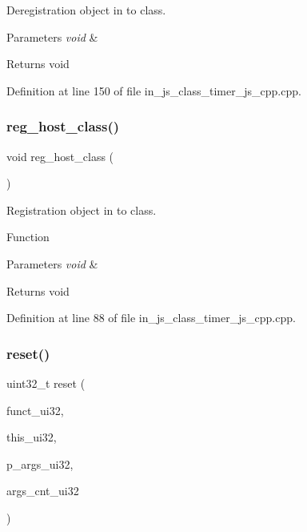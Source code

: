 Deregistration object in to class. 


\begin{DoxyParams}{Parameters}
{\em void} & \\
\hline
\end{DoxyParams}
\begin{DoxyReturn}{Returns}
void 
\end{DoxyReturn}


Definition at line 150 of file in\+\_\+js\+\_\+class\+\_\+timer\+\_\+js\+\_\+cpp.\+cpp.

\mbox{\label{group___timer_ga69ac449c8b71f2f20b05676a828a8382}} 
\subsubsection{reg\_host\_class()}
{\footnotesize\ttfamily void reg\+\_\+host\+\_\+class (\begin{DoxyParamCaption}\item[{void}]{ }\end{DoxyParamCaption})}



Registration object in to class. 

Function
\begin{DoxyParams}{Parameters}
{\em void} & \\
\hline
\end{DoxyParams}
\begin{DoxyReturn}{Returns}
void 
\end{DoxyReturn}


Definition at line 88 of file in\+\_\+js\+\_\+class\+\_\+timer\+\_\+js\+\_\+cpp.\+cpp.

\mbox{\label{group___timer_gaff5533e32f3367fc799c8f054a3b8d8e}} 
\subsubsection{reset()}
{\footnotesize\ttfamily uint32\+\_\+t reset (\begin{DoxyParamCaption}\item[{const uint32\+\_\+t}]{funct\+\_\+ui32,  }\item[{const uint32\+\_\+t}]{this\+\_\+ui32,  }\item[{const uint32\+\_\+t $\ast$}]{p\+\_\+args\+\_\+ui32,  }\item[{const uint32\+\_\+t}]{args\+\_\+cnt\+\_\+ui32 }\end{DoxyParamCaption})\hspace{0.3cm}{\ttfamily [static]}}



